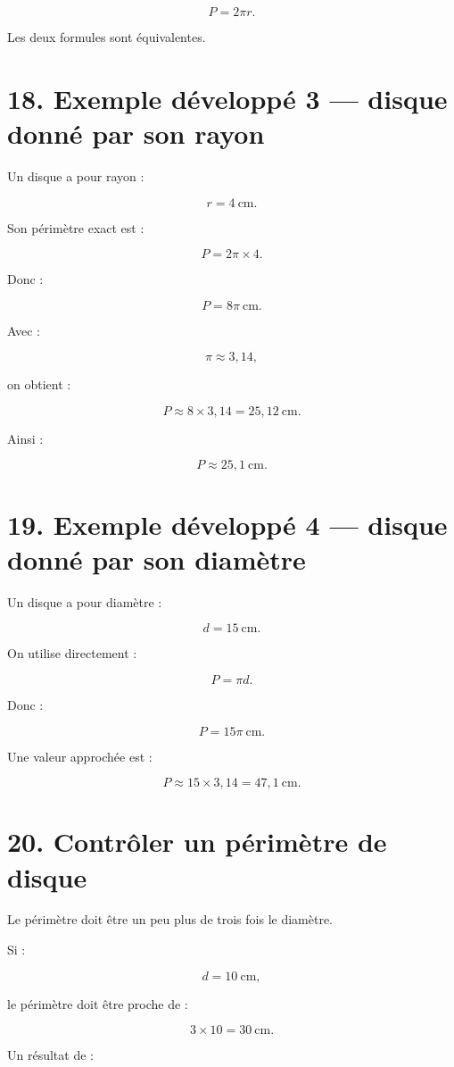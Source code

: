 \[
\boxed{P=2\pi r}.
\]

Les deux formules sont équivalentes.

\section{18. Exemple développé 3 — disque donné par son rayon}

Un disque a pour rayon :

\[
r=4\ \text{cm}.
\]

Son périmètre exact est :

\[
P=2\pi\times4.
\]

Donc :

\[
P=8\pi\ \text{cm}.
\]

Avec :

\[
\pi\approx3{,}14,
\]

on obtient :

\[
P\approx8\times3{,}14=25{,}12\ \text{cm}.
\]

Ainsi :

\[
\boxed{P\approx25{,}1\ \text{cm}}.
\]

\section{19. Exemple développé 4 — disque donné par son diamètre}

Un disque a pour diamètre :

\[
d=15\ \text{cm}.
\]

On utilise directement :

\[
P=\pi d.
\]

Donc :

\[
P=15\pi\ \text{cm}.
\]

Une valeur approchée est :

\[
P\approx15\times3{,}14=47{,}1\ \text{cm}.
\]

\section{20. Contrôler un périmètre de disque}

Le périmètre doit être un peu plus de trois fois le diamètre.

Si :

\[
d=10\ \text{cm},
\]

le périmètre doit être proche de :

\[
3\times10=30\ \text{cm}.
\]

Un résultat de :


